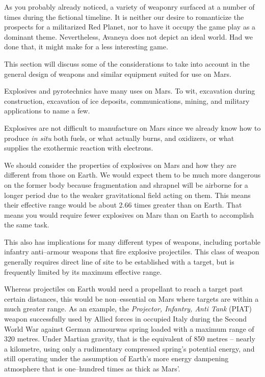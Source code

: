 

As you probably already noticed, a variety of weaponry surfaced at a number of times during the fictional timeline. It is neither our desire to romanticize the prospects for a militarized Red Planet, nor to have it occupy the game play as a dominant theme. Nevertheless, Avaneya does not depict an ideal world. Had we done that, it might make for a less interesting game.

This section will discuss some of the considerations to take into account in the general design of weapons and similar equipment suited for use on Mars.


Explosives and pyrotechnics have many uses on Mars. To wit, excavation during construction, excavation of ice deposits, communications, mining, and military applications to name a few.

Explosives are not difficult to manufacture on Mars since we already know how to produce {\it in situ} both fuels, or what actually burns, and oxidizers, or what supplies the exothermic reaction with electrons. %

We should consider the properties of explosives on Mars and how they are different from those on Earth. We would expect them to be much more dangerous on the former body because fragmentation and shrapnel will be airborne for a longer period due to the weaker gravitational field acting on them. This means their effective range would be about 2.66 times greater than on Earth. That means you would require fewer explosives on Mars than on Earth to accomplish the same task.

This also has implications for many different types of weapons, including portable infantry anti--armour weapons that fire explosive projectiles. This class of weapon generally requires direct line of site to be established with a target, but is frequently limited by its maximum effective range. 

Whereas projectiles on Earth would need a propellant to reach a target past certain distances, this would be non--essential on Mars where targets are within a much greater range. As an example, the {\it Projector, Infantry, Anti Tank} (PIAT) weapon successfully used by Allied forces in occupied Italy during the Second World War against German armour\footnotecite[extras={ p.~351.}][roy1965] was spring loaded with a maximum range of 320 metres. Under Martian gravity, that is the equivalent of 850 metres -- nearly a kilometre, using only a rudimentary compressed spring's potential energy, and still operating under the assumption of Earth's more energy dampening atmosphere that is one--hundred times as thick as Mars'.

